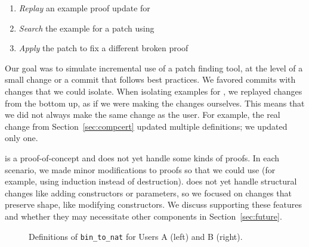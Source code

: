\begin{enumerate}
\item \textit{Replay} an example proof update for \sysname
\item \textit{Search} the example for a patch using \sysname
\item \textit{Apply} the patch to fix a different broken proof
\end{enumerate}


Our goal was to simulate incremental use of a patch finding tool,
at the level of a small change or a commit that follows best practices.
We favored commits with changes that we could
isolate. When isolating examples for \sysname, we replayed changes from the bottom up,
as if we were making the changes ourselves.
This means that we did not always make the same change as the user. For example,
the real change from Section~\ref{sec:compcert} updated multiple definitions;
we updated only one.

\sysname is a proof-of-concept and does not yet handle some kinds of proofs.
In each scenario, we made minor modifications to proofs so that we could use \sysname (for example,
using induction instead of destruction).
\sysname does not yet handle structural changes like adding constructors or parameters, 
so we focused on changes that preserve shape, like modifying constructors.
We discuss supporting these features and whether they may necessitate other components in Section~\ref{sec:future}.

\begin{figure*}[ht]
\begin{minipage}{0.48\textwidth}
\lstset{language=coq, aboveskip=0pt,belowskip=0pt} %



\end{minipage}
\hfill
\begin{minipage}{0.48\textwidth}
\lstset{language=coq, aboveskip=0pt,belowskip=0pt}  %



\end{minipage}
\vspace{-.35cm}
\caption[Caption for LOF]{Definitions of \lstinline{bin_to_nat} for Users A (left) and B (right).}
\label{fig:bintonat}
\end{figure*}

